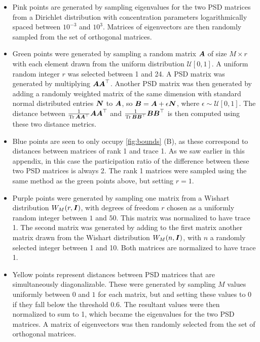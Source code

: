 \begin{itemize}


    \item Pink points are generated by sampling eigenvalues for the two PSD matrices from a Dirichlet distribution with concentration parameters logarithmically spaced between $10^{-3}$ and $10^3$.  
Matrices of eigenvectors are then randomly sampled from the set of orthogonal matrices.


    \item Green points were generated by sampling a random matrix $\boldsymbol{A}$ of size $M\times r$ with each element drawn from the uniform distribution $\mathcal{U}[0,1]$.  
A uniform random integer $r$ was selected between 1 and 24.
A PSD matrix was generated by multiplying $\boldsymbol{A} \boldsymbol{A}^\top$.  
Another PSD matrix was then generated by adding a randomly weighted matrix of the same dimension with standard normal distributed entries $\boldsymbol{N}$ to $\boldsymbol{A}$, so $\boldsymbol{B} = \boldsymbol{A} + \epsilon  \boldsymbol{N} $, where $\epsilon \sim \mathcal{U}[0,1]$.  
The distance between $ \frac{1}{\operatorname*{Tr} \boldsymbol{A} \boldsymbol{A}^\top} \boldsymbol{A} \boldsymbol{A}^\top$ and $\frac{1}{\operatorname*{Tr} \boldsymbol{B} \boldsymbol{B}^\top} \boldsymbol{B} \boldsymbol{B}^\top$ is then computed using these two distance metrics.

    \item Blue points are seen to only occupy \cref{fig:bounds} (B), as these correspond to distances between matrices of rank 1 and trace 1.
As we saw earlier in this appendix, in this case the participation ratio of the difference between these two PSD matrices is always 2.  
The rank 1 matrices were sampled using the same method as the green points above, but setting $r = 1$.  

    \item Purple points were generated by sampling one matrix from a Wishart distribution $W_M(r,\boldsymbol{I})$, with degrees of freedom $r$ chosen as a uniformly random integer between $1$ and $50$.  This matrix was normalized to have trace 1.
The second matrix was generated by adding to the first matrix another matrix drawn from the Wishart distribution $W_M(n, \boldsymbol{I})$, with $n$ a randomly selected integer between 1 and 10.  Both matrices are normalized to have trace 1. 

    \item Yellow points represent distances between PSD matrices that are simultaneously diagonalizable.  These were generated by sampling $M$ values uniformly between $0$ and $1$ for each matrix, but and setting these values to 0 if they fall below the threshold 0.6.  
    The resultant values were then normalized to sum to 1, which became the eigenvalues for the two PSD matrices. 
A matrix of eigenvectors was then randomly selected from the set of orthogonal matrices.    

\end{itemize}

